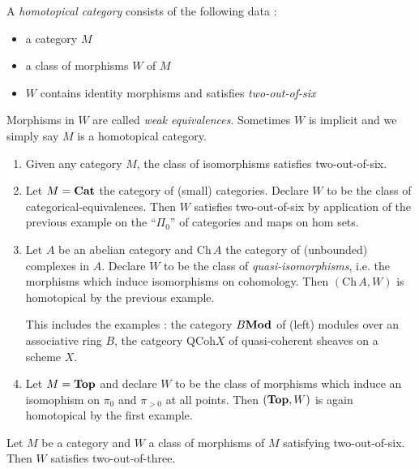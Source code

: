 \documentclass[./main.tex]{subfiles}
\begin{document}
  
\begin{dfn}

  A \emph{homotopical category} consists of the following data : 
  \begin{itemize}
    \item a category $M$
    \item a class of morphisms $W$ of $M$
    \item $W$ contains identity morphisms and satisfies \emph{two-out-of-six}
  \end{itemize}

  Morphisms in $W$ are called \emph{weak equivalences}.
  Sometimes $W$ is implicit and we simply say $M$ is a homotopical category.
\end{dfn}

\begin{eg}
  \begin{enumerate}
    \item 
    Given any category $M$,
    the class of isomorphisms satisfies two-out-of-six.
    \item Let $M = \mathbf{Cat}$ the category of (small) categories.
    Declare $W$ to be the class of categorical-equivalences.
    Then $W$ satisfies two-out-of-six by application of
    the previous example on the ``$\Pi_0$'' of categories
    and maps on hom sets.
    \item Let $A$ be an abelian category and $\mathrm{Ch}\,A$
    the category of (unbounded) complexes in $A$.
    Declare $W$ to be the class of \emph{quasi-isomorphisms},
    i.e. the morphisms which induce isomorphisms on cohomology.
    Then $(\mathrm{Ch}\, A , W)$ is homotopical by the previous example.

    This includes the examples : 
    the category $B\mathbf{Mod}$ of (left) modules over an associative ring $B$,
    the catgeory $\mathrm{QCoh} X$ of quasi-coherent sheaves on a scheme $X$.
    \item Let $M = \mathbf{Top}$ and declare $W$ to be the class of morphisms
    which induce an isomophism on $\pi_0$ and 
    $\pi_{> 0}$ at all points.
    Then $(\mathbf{Top} , W)$ is again homotopical by the first example.
  \end{enumerate}
\end{eg}

\begin{lem}
  
  Let $M$ be a category and $W$ a class of morphisms of $M$
  satisfying two-out-of-six.
  Then $W$ satisfies two-out-of-three.

  \begin{proof1}
  \end{proof1}
\end{lem}
\end{document}
